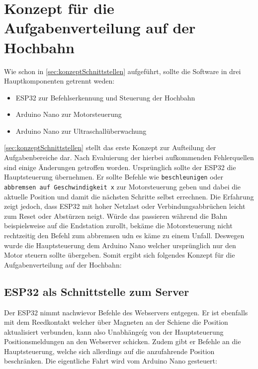 \section{Konzept für die Aufgabenverteilung auf der Hochbahn}
\label{sec:hochbahnAlsClient}
Wie schon in \autoref{sec:konzeptSchnittstellen} aufgeführt, sollte die Software in drei Hauptkomponenten getrennt weden:
\begin{itemize}
	\item ESP32 zur Befehlserkennung und Steuerung der Hochbahn
	\item Arduino Nano zur Motorsteuerung
	\item Arduino Nano zur Ultraschallüberwachung
\end{itemize}
\autoref{sec:konzeptSchnittstellen} stellt das erste Konzept zur Aufteilung der Aufgabenbereiche dar. Nach Evaluierung der hierbei aufkommenden Fehlerquellen sind einige Änderungen getroffen worden.
Ursprünglich sollte der ESP32 die Hauptsteuerung übernehmen. Er sollte Befehle wie \texttt{beschleunigen} oder \texttt{abbremsen auf Geschwindigkeit x} zur Motorsteuerung geben und dabei die aktuelle Position und damit die nächsten Schritte selbst errechnen. Die Erfahrung zeigt jedoch, dass ESP32 mit hoher Netzlast oder Verbindungsabbrüchen leicht zum Reset oder Abstürzen neigt. Würde das passieren während die Bahn beispielsweise auf die Endstation zurollt, bekäme die Motorsteuerung nicht rechtzeitig den Befehl zum abbremsen udn es käme zu einem Unfall.
Deswegen wurde die Hauptsteuerung dem Arduino Nano welcher ursprünglich nur den Motor steuern sollte übergeben. Somit ergibt sich folgendes Konzept für die Aufgabenverteilung auf der Hochbahn:

\subsection{ESP32 als Schnittstelle zum Server}
\label{sec:aufgabeESP}
Der ESP32 nimmt nachwievor Befehle des Webservers entgegen. Er ist ebenfalls mit dem Reedkontakt welcher über Magneten an der Schiene die Position aktualisiert verbunden, kann also Unabhängeíg von der Hauptsteuerung Positionsmeldungen an den Webserver schicken. Zudem gibt er Befehle an die Hauptsteuerung, welche sich allerdings auf die anzufahrende Position beschränken. Die eigentliche Fahrt wird vom Arduino Nano gesteuert:

